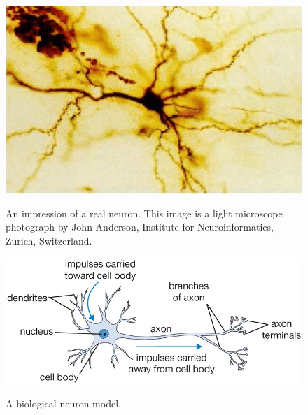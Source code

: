 \begin{figure}[h]
\centering
{\includegraphics[scale=0.65]{media_tesi/real_neuron.png}}
\caption{An impression of a real neuron. This image is a light microscope photograph by John Anderson, Institute for Neuroinformatics, Zurich, Switzerland.}
\label{fig:subfig}
\end{figure}

\vspace{1.5 cm}

\begin{figure}[h]
\centering
{\includegraphics[scale=0.65]{media_tesi/neuron_model.png}}
\caption{A biological neuron model.}
\label{fig:subfig}
\end{figure}

%
%
%
%
%
%
%
\clearpage

